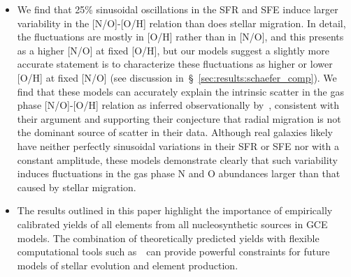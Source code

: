 \documentclass[ms.tex]{subfiles}
\begin{document}
\begin{itemize}
	\item We find that 25\% sinusoidal oscillations in the SFR and SFE induce 
	larger variability in the [N/O]-[O/H] relation than does stellar migration. 
	In detail, the fluctuations are mostly in [O/H] rather than in [N/O], and 
	this presents as a higher [N/O] at fixed [O/H], but our models suggest a 
	slightly more accurate statement is to characterize these fluctuations as 
	higher or lower [O/H] at fixed [N/O] (see discussion 
	in~\S~\ref{sec:results:schaefer_comp}). 
	We find that these models can accurately explain the intrinsic scatter in 
	the gas phase [N/O]-[O/H] relation as inferred observationally 
	by~\citet{Schaefer2020}, consistent with their argument and supporting 
	their conjecture that radial migration is not the dominant source of 
	scatter in their data. 
	Although real galaxies likely have neither perfectly sinusoidal variations 
	in their SFR or SFE nor with a constant amplitude, these models demonstrate 
	clearly that such variability induces fluctuations in the gas phase N and O 
	abundances larger than that caused by stellar migration. 

	\item The results outlined in this paper highlight the importance of 
	empirically calibrated yields of all elements from all nucleosynthetic 
	sources in GCE models. 
	The combination of theoretically predicted yields with flexible 
	computational tools such as~\vice~can provide powerful constraints for 
	future models of stellar evolution and element production. 
\end{itemize} 
\end{document}
